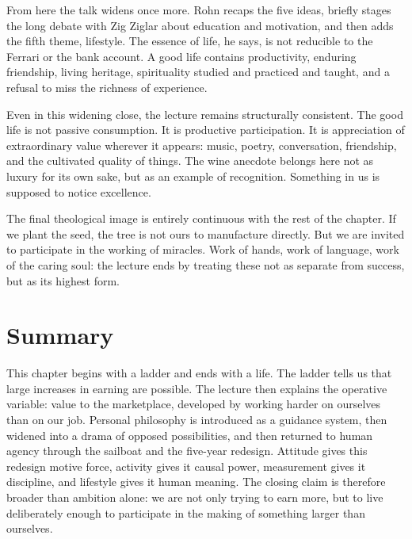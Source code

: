 From here the talk widens once more. Rohn recaps the five ideas, briefly stages the long debate with Zig Ziglar about education and motivation, and then adds the fifth theme, lifestyle. The essence of life, he says, is not reducible to the Ferrari or the bank account. A good life contains productivity, enduring friendship, living heritage, spirituality studied and practiced and taught, and a refusal to miss the richness of experience.

Even in this widening close, the lecture remains structurally consistent. The good life is not passive consumption. It is productive participation. It is appreciation of extraordinary value wherever it appears: music, poetry, conversation, friendship, and the cultivated quality of things. The wine anecdote belongs here not as luxury for its own sake, but as an example of recognition. Something in us is supposed to notice excellence.

The final theological image is entirely continuous with the rest of the chapter. If we plant the seed, the tree is not ours to manufacture directly. But we are invited to participate in the working of miracles. Work of hands, work of language, work of the caring soul: the lecture ends by treating these not as separate from success, but as its highest form.

\section{Summary}

This chapter begins with a ladder and ends with a life. The ladder tells us that large increases in earning are possible. The lecture then explains the operative variable: value to the marketplace, developed by working harder on ourselves than on our job. Personal philosophy is introduced as a guidance system, then widened into a drama of opposed possibilities, and then returned to human agency through the sailboat and the five-year redesign. Attitude gives this redesign motive force, activity gives it causal power, measurement gives it discipline, and lifestyle gives it human meaning. The closing claim is therefore broader than ambition alone: we are not only trying to earn more, but to live deliberately enough to participate in the making of something larger than ourselves.
